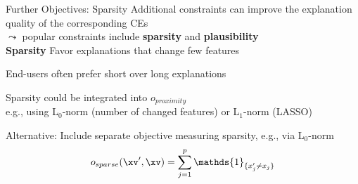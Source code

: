 \documentclass[10pt,compress,t,notes=noshow, xcolor=table]{beamer}
\begin{document}
\begin{framev}[align=top]{Further Objectives: Sparsity}
Additional constraints can improve the explanation quality of the corresponding CEs\\
$\leadsto$ popular constraints include \textbf{sparsity} and \textbf{plausibility}\\
\spacer[0.25]
\textbf{Sparsity} Favor explanations that change few features
\begin{itemizeM}
\item<+-> End-users often prefer short over long explanations
\item<+-> Sparsity could be integrated into $o_{proximity}$\\
e.g., using L$_0$-norm (number of changed features) or L$_1$-norm (LASSO)
\item<+-> Alternative: Include separate objective measuring sparsity, e.g., via L$_0$-norm
$$
o_{sparse}(\xv', \xv) = \sum_{j = 1}^p \mathds{1}_{\{x'_j \neq x_j\}}
$$
\end{itemizeM}
\end{framev}
\end{document}
